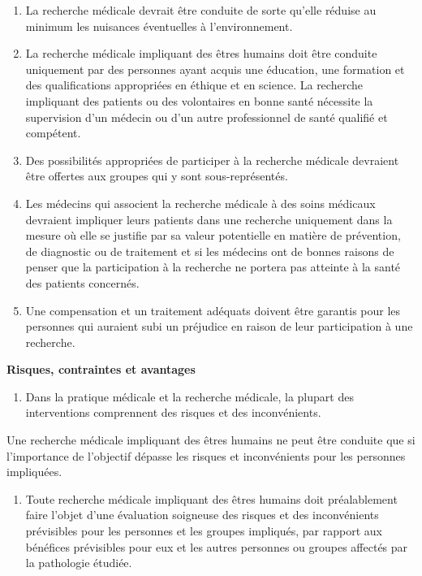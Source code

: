 \documentclass[
  12pt,
]{book}
\providecommand{\tightlist}{%
  \setlength{\itemsep}{0pt}\setlength{\parskip}{0pt}}
\begin{document}
\begin{enumerate}
\item
  La recherche médicale devrait être conduite de sorte qu'elle réduise au minimum les nuisances éventuelles à l'environnement.
\item
  La recherche médicale impliquant des êtres humains doit être conduite uniquement par des personnes ayant acquis une éducation, une formation et des qualifications appropriées en éthique et en science. La recherche impliquant des patients ou des volontaires en bonne santé nécessite la supervision d'un médecin ou d'un autre professionnel de santé qualifié et compétent.
\item
  Des possibilités appropriées de participer à la recherche médicale devraient être offertes aux groupes qui y sont sous-représentés.
\item
  Les médecins qui associent la recherche médicale à des soins médicaux devraient impliquer leurs patients dans une recherche uniquement dans la mesure où elle se justifie par sa valeur potentielle en matière de prévention, de diagnostic ou de traitement et si les médecins ont de bonnes raisons de penser que la participation à la recherche ne portera pas atteinte à la santé des patients concernés.
\item
  Une compensation et un traitement adéquats doivent être garantis pour les personnes qui auraient subi un préjudice en raison de leur participation à une recherche.
\end{enumerate}

\textbf{Risques, contraintes et avantages}

\begin{enumerate}
\def\labelenumi{\arabic{enumi}.}
\setcounter{enumi}{15}
\tightlist
\item
  Dans la pratique médicale et la recherche médicale, la plupart des interventions comprennent des risques et des inconvénients.
\end{enumerate}

Une recherche médicale impliquant des êtres humains ne peut être conduite que si l'importance de l'objectif dépasse les risques et inconvénients pour les personnes impliquées.

\begin{enumerate}
\def\labelenumi{\arabic{enumi}.}
\setcounter{enumi}{16}
\tightlist
\item
  Toute recherche médicale impliquant des êtres humains doit préalablement faire l'objet d'une évaluation soigneuse des risques et des inconvénients prévisibles pour les personnes et les groupes impliqués, par rapport aux bénéfices prévisibles pour eux et les autres personnes ou groupes affectés par la pathologie étudiée.
\end{enumerate}
\end{document}

